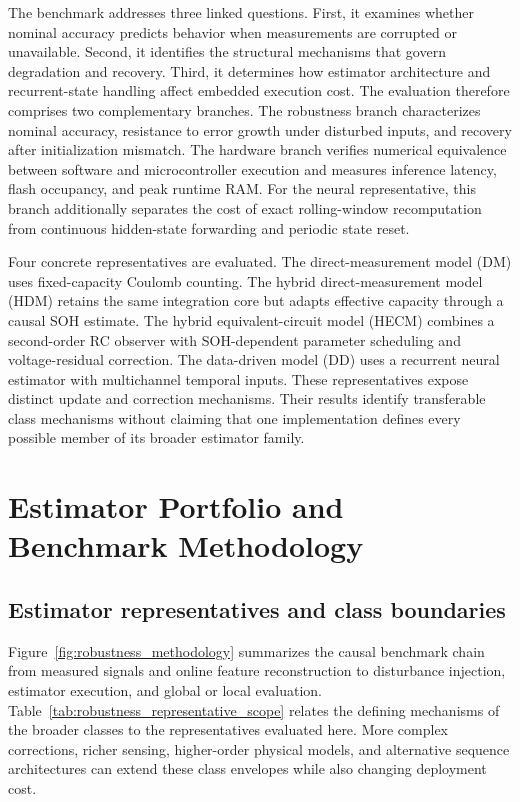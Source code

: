 The benchmark addresses three linked questions. First, it examines whether nominal accuracy predicts behavior when measurements are corrupted or unavailable. Second, it identifies the structural mechanisms that govern degradation and recovery. Third, it determines how estimator architecture and recurrent-state handling affect embedded execution cost. The evaluation therefore comprises two complementary branches. The robustness branch characterizes nominal accuracy, resistance to error growth under disturbed inputs, and recovery after initialization mismatch. The hardware branch verifies numerical equivalence between software and microcontroller execution and measures inference latency, flash occupancy, and peak runtime RAM. For the neural representative, this branch additionally separates the cost of exact rolling-window recomputation from continuous hidden-state forwarding and periodic state reset.

Four concrete representatives are evaluated. The direct-measurement model (DM) uses fixed-capacity Coulomb counting. The hybrid direct-measurement model (HDM) retains the same integration core but adapts effective capacity through a causal SOH estimate. The hybrid equivalent-circuit model (HECM) combines a second-order RC observer with SOH-dependent parameter scheduling and voltage-residual correction. The data-driven model (DD) uses a recurrent neural estimator with multichannel temporal inputs. These representatives expose distinct update and correction mechanisms. Their results identify transferable class mechanisms without claiming that one implementation defines every possible member of its broader estimator family.

\section{Estimator Portfolio and Benchmark Methodology}

\subsection{Estimator representatives and class boundaries}

Figure~\ref{fig:robustness_methodology} summarizes the causal benchmark chain from measured signals and online feature reconstruction to disturbance injection, estimator execution, and global or local evaluation. Table~\ref{tab:robustness_representative_scope} relates the defining mechanisms of the broader classes to the representatives evaluated here. More complex corrections, richer sensing, higher-order physical models, and alternative sequence architectures can extend these class envelopes while also changing deployment cost.

